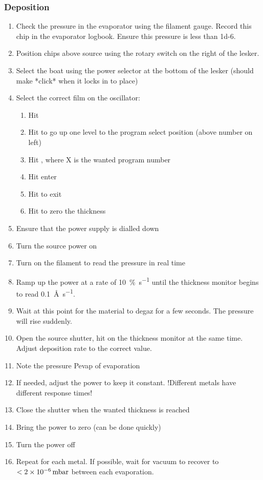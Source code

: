 \subsubsection{Deposition}
\begin{enumerate}[resume]
\item Check the pressure in the evaporator using the filament gauge. Record this chip in the evaporator logbook. Ensure this pressure is less than \SI{1d-6}{\torr}.
\item Position chips above source using the rotary switch on the right of the lesker.
\item Select the boat using the power selector at the bottom of the lesker (should make *click* when it locks in to place)
\item Select the correct film on the oscillator:
\begin{enumerate}
  \item Hit 
  \item Hit  to go up one level to the program select position (above number on left)
  \item Hit , where X is the wanted program number
  \item Hit enter 
  \item Hit  to exit
  \item Hit  to zero the thickness
\end{enumerate}
\item Ensure that the power supply is dialled down
\item Turn the source power on
\item Turn on the filament to read the pressure in real time
\item Ramp up the power at a rate of \SI{10}{\percent\per\second} until the thickness monitor begins to read \SI{0.1}{\angstrom\per\second}.
\item Wait at this point for the material to degaz for a few seconds. The pressure will rise suddenly.
\item Open the source shutter, hit  on the thickness monitor at the same time. Adjust deposition rate to the correct value. 
\item Note the pressure Pevap of evaporation
\item If needed, adjust the power to keep it constant. !Different metals have different response times! 
\item Close the shutter when the wanted thickness is reached
\item Bring the power to zero (can be done quickly)
\item Turn the power off
\item Repeat for each metal. If possible, wait for vacuum to recover to $< \SI{2d-6}{\milli\bar}$ between each evaporation.
\end{enumerate}

